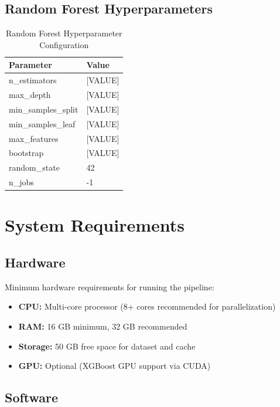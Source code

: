 \subsection{Random Forest Hyperparameters}
\label{app:rf_params}

\begin{table}[htbp]
    \centering
    \caption{Random Forest Hyperparameter Configuration}
    \begin{tabular}{ll}
        \toprule
        \textbf{Parameter} & \textbf{Value} \\
        \midrule
        n\_estimators & [VALUE] \\
        max\_depth & [VALUE] \\
        min\_samples\_split & [VALUE] \\
        min\_samples\_leaf & [VALUE] \\
        max\_features & [VALUE] \\
        bootstrap & [VALUE] \\
        random\_state & 42 \\
        n\_jobs & -1 \\
        \bottomrule
    \end{tabular}
\end{table}

\section{System Requirements}
\label{app:system_requirements}

\subsection{Hardware}
\label{app:hardware}

Minimum hardware requirements for running the pipeline:

\begin{itemize}
    \item \textbf{CPU:} Multi-core processor (8+ cores recommended for parallelization)
    \item \textbf{RAM:} 16 GB minimum, 32 GB recommended
    \item \textbf{Storage:} 50 GB free space for dataset and cache
    \item \textbf{GPU:} Optional (XGBoost GPU support via CUDA)
\end{itemize}

\subsection{Software}
\label{app:software}

